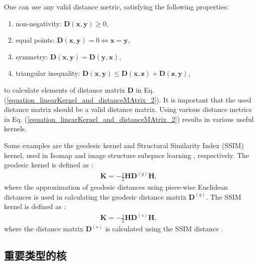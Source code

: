 \documentclass[lang=cn,10pt]{gorgeousnbook}
\numberwithin{equation}{section}%
\numberwithin{figure}{section}%
\begin{document}
\begin{remark}
One can use any valid distance metric, satisfying the following properties:
\begin{enumerate}[topsep=0pt,itemsep=-1ex,partopsep=1ex,parsep=1ex]
\item non-negativity: $\boldsymbol{D}(\boldsymbol{x}, \boldsymbol{y}) \geq 0$, 
\item equal points: $\boldsymbol{D}(\boldsymbol{x}, \boldsymbol{y}) = 0 \iff \boldsymbol{x} = \boldsymbol{y}$, 
\item symmetry: $\boldsymbol{D}(\boldsymbol{x}, \boldsymbol{y}) = \boldsymbol{D}(\boldsymbol{y}, \boldsymbol{x})$, 
\item triangular inequality: $\boldsymbol{D}(\boldsymbol{x}, \boldsymbol{y}) \leq \boldsymbol{D}(\boldsymbol{x}, \boldsymbol{z})\! + \boldsymbol{D}(\boldsymbol{z}, \boldsymbol{y})$,
\end{enumerate}
to calculate elements of distance matrix $\boldsymbol{D}$ in Eq. (\ref{equation_linearKernel_and_distanceMAtrix_2}). It is important that the used distance matrix should be a valid distance matrix. Using various distance metrics in Eq. (\ref{equation_linearKernel_and_distanceMAtrix_2}) results in various useful kernels.
\end{remark}

Some examples are the geodesic kernel and Structural Similarity Index (SSIM) kernel, used in Isomap \cite{tenenbaum2000global} and image structure subspace learning \cite{ghojogh2019image}, respectively. 
The geodesic kernel is defined as \cite{tenenbaum2000global,ghojogh2020multidimensional}:
\begin{align}
\boldsymbol{K} = -\frac{1}{2} \boldsymbol{H}\boldsymbol{D}^{(g)}\boldsymbol{H},
\end{align}
where the approximation of geodesic distances using piece-wise Euclidean distances is used in calculating the geodesic distance matrix $\boldsymbol{D}^{(g)}$. 
The SSIM kernel is defined as \cite{ghojogh2019image}:
\begin{align}
\boldsymbol{K} = -\frac{1}{2} \boldsymbol{H} \boldsymbol{D}^{(s)} \boldsymbol{H},
\end{align}
where the distance matrix $\boldsymbol{D}^{(s)}$ is calculated using the SSIM distance \cite{brunet2011mathematical}. 


\subsection{重要类型的核} \label{section_universal_characteristic_kernels}
\end{document}
